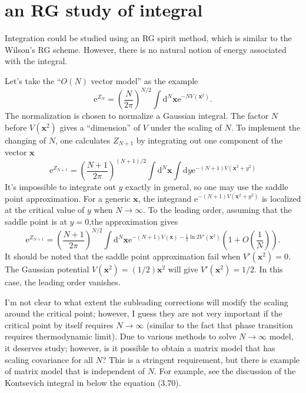 \section{an RG study of integral}
Integration could be studied using an RG spirit method,
which is similar to the Wilson's RG scheme.
However, there is no natural notion of energy associated with the integral.

Let's take the ``$O(N)$ vector model'' as the example
\begin{equation}
	\mathrm{e}^{Z_N} = \left(\frac{N}{2\pi}\right)^{N / 2} \int \mathrm{d}^N \mathbf{x} \mathrm{e}^{-N V(\mathbf{x}^2)}
.\end{equation}
The normalization is chosen to normalize a Gaussian integral.
The factor $N$ before $V(\mathbf{x}^2)$ gives a ``dimension'' of $V$ under the scaling of $N$.
To implement the changing of $N$, one calculates $Z_{N+1}$ by integrating out one component of the vector $\mathbf{x}$
\begin{equation}
	\mathrm{e}^{Z_{N+1}} = \left(\frac{N+1}{2\pi}\right)^{(N+1)/2} \int \mathrm{d}^N \mathbf{x} \int \mathrm{d} y \mathrm{e}^{-(N+1) V(\mathbf{x}^2 + y^2)}
\end{equation}
It's impossible to integrate out $y$ exactly in general,
so one may use the saddle point approximation.
For a generic $\mathbf{x}$, the integrand $\mathrm{e}^{-(N+1)V(\mathbf{x}^2 + y^2)}$ is localized at the critical value of $y$ when $N\to\infty$.
To the leading order, assuming that the saddle point is at $y=0$,the approximation gives \[
	\mathrm{e}^{Z_{N+1}} = \left(\frac{N+1}{2\pi}\right)^{N / 2} \int \mathrm{d}^N \mathbf{x} \mathrm{e}^{-(N+1)V(\mathbf{x}) - \frac{1}{2} \ln 2 V'(\mathbf{x}^2)} \left(1 + O(\frac{1}{N})\right)
.\] 
It should be noted that the saddle point approximation fail when $V'(\mathbf{x}^2) = 0$.
The Gaussian potential $V(\mathbf{x}^2) = (1 /2) \mathbf{x}^2$ will give $ V'(\mathbf{x}^2) = 1 /2$.
In this case, the leading order vanishes.

I'm not clear to what extent the subleading corrections will modify the scaling around the critical point;
however, I guess they are not very important if the critical point by itself requires $N\to\infty$
(similar to the fact that phase transition requires thermodynamic limit).
Due to various methods to solve $N\to\infty$ model, it deserves study;
however, is it possible to obtain a matrix model that has scaling covariance for all $N$?
This is a stringent requirement,
but there is example of matrix model that is independent of $N$.
For example, see the discussion of the Kontsevich integral in
below the equation (3.70).

